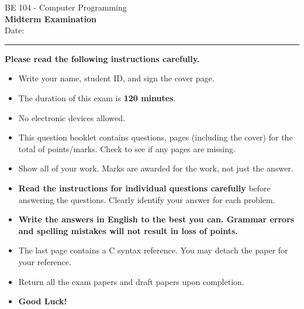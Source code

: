 \documentclass[12pt,a4paper,addpoints]{exam}
\def\CourseTitle{Computer Programming}
\def\ExamName{Midterm Examination}
\def\CourseNumber{BE 104}
\def\ExamDate{November 30, 2026}
\def\ExamDuration{120 minutes}
\begin{document}
\begin{center}
\Large {{\CourseNumber} - {\CourseTitle}\\
\vspace{5pt}
\textbf{\ExamName}\\
\vspace{5pt}
Date: \enspace {\ExamDate}}
\end{center}

\vspace{10pt}
\hrule
\vspace{10pt}

\begin{center}
\vspace{10pt}
\textbf{Please read the following instructions carefully.}
\vspace{10pt}
\begin{itemize}
    \item Write your name, student ID, and sign the cover page.
    \item The duration of this exam is \textbf{{\ExamDuration}}.
    \item No electronic devices allowed.
    \item This question booklet contains \textbf{\numquestions} questions, \textbf{\numpages} pages (including the cover) for the total of \textbf{\numpoints} points/marks. Check to see if any pages are missing.
    \item Show all of your work. Marks are awarded for the work, not just the answer.
    \item \textbf{Read the instructions for individual questions carefully} before answering the questions. Clearly identify your answer for each problem.
    \item \textbf{Write the answers in English to the best you can. Grammar errors and spelling mistakes will not result in loss of points.}
    \item The last page contains a C syntax reference. You may detach the paper for your reference.
    \item Return all the exam papers and draft papers upon completion.
    \item \textbf{\large Good Luck!}
\end{itemize}
\end{center}

\vspace{3cm}
\noindent
\begin{minipage}{0.5\linewidth}
     \\[30pt]
     \\[30pt]
     \\[60pt]
\end{minipage}%
\end{document}
